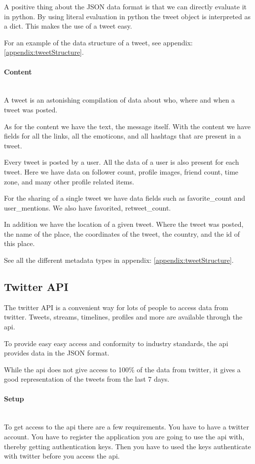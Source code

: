 A positive thing about the JSON data format is that we can directly evaluate it
in python. By using literal evaluation in python the tweet object is
interpreted as a dict. This makes the use of a tweet easy.  

For an example of the data structure of a tweet, see appendix:
\ref{appendix:tweetStructure}.

\paragraph{Content}
\hspace{0pt}\\
A tweet is an astonishing compilation of data about who, where and when a tweet
was posted.

As for the content we have the text, the message itself. With the content we
have fields for all the links, all the emoticons, and all hashtags that are
present in a tweet. 

Every tweet is posted by a user. All the data of a user is also present for
each tweet. Here we have data on follower count, profile images, friend count,
time zone, and many other profile related items. 

For the sharing of a single tweet we have data fields such as favorite\_count
and user\_mentions. We also have favorited, retweet\_count. 

In addition we have the location of a given tweet. Where the tweet was posted,
the name of the place, the coordinates of the tweet, the country, and the id of
this place. 

See all the different metadata types in appendix: \ref{appendix:tweetStructure}.
%

\subsection{Twitter API}
The twitter API is a convenient way for lots of people to access data from
twitter. Tweets, streams, timelines, profiles and more are available through
the api. 

To provide easy easy access and conformity to industry standards, the api
provides data in the JSON format. 

While the api does not give access to 100\% of the data from twitter, it gives
a good representation of the tweets from the last 7 days.
%

\paragraph{Setup}
\hspace{0pt}\\
To get access to the api there are a few requirements. You have to have a
twitter account. You have to register the application you are going to use the
api with, thereby getting authentication keys. Then you have to used the keys
authenticate with twitter before you access the api. 


